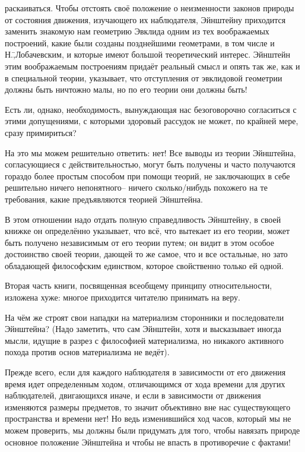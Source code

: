раскаиваться. Чтобы отстоять своё положение о неизменности законов природы от состояния движения, изучающего их наблюдателя, Эйнштейну приходится заменить знакомую нам геометрию Эвклида одним из тех воображаемых построений, какие были созданы позднейшими геометрами, в том числе и Н.\=,Лобачевским, и которые имеют большой теоретический интерес. Эйнштейн этим воображаемым построениям придаёт реальный смысл и опять так же, как и в специальной теории, указывает, что отступления от эвклидовой геометрии должны быть ничтожно малы, но по его теории они должны быть!

Есть ли, однако, необходимость, вынуждающая нас безоговорочно согласиться с этими допущениями, с которыми здоровый рассудок не может, по крайней мере, сразу примириться?

На это мы можем решительно ответить: нет! Все выводы из теории Эйнштейна, согласующиеся с действительностью, могут быть получены и часто получаются гораздо более простым способом при помощи теорий, не заключающих в себе решительно ничего непонятного\--- ничего сколько\-/нибудь похожего на те требования, какие предъявляются теорией Эйнштейна.

В этом отношении надо отдать полную справедливость Эйнштейну, в своей книжке он определённо указывает, что всё, что вытекает из его теории, может быть получено независимым от его теории путем; он видит в этом особое достоинство своей теории, дающей то же самое, что и все остальные, но зато обладающей философским единством, которое свойственно только ей одной.

Вторая часть книги, посвященная всеобщему принципу относительности, изложена хуже: многое приходится читателю принимать на веру.

На чём же строят свои нападки на материализм сторонники и последователи Эйнштейна? (Надо заметить, что сам Эйнштейн, хотя и высказывает иногда мысли, идущие в разрез с философией материализма, но никакого активного похода против основ материализма не ведёт).

Прежде всего, если для каждого наблюдателя в зависимости от его движения время идет определенным ходом, отличающимся от хода времени для других наблюдателей, двигающихся иначе, и если в зависимости от движения изменяются размеры предметов, то значит объективно вне нас существующего пространства и времени нет! Но ведь изменившийся ход часов, который мы не можем проверить, мы должны были придумать для того, чтобы навязать природе основное положение Эйнштейна и чтобы не впасть в противоречие с фактами!

